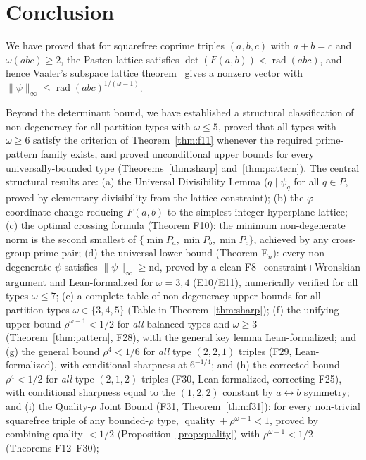 \documentclass[12pt]{article}
\theoremstyle{definition}
\DeclareMathOperator{\rad}{rad}
\begin{document}
\endgroup
\section{Conclusion}

We have proved that for squarefree coprime triples $(a,b,c)$ with $a+b=c$ and
$\omega(abc) \ge 2$, the Pasten lattice satisfies $\det(F(a,b)) < \rad(abc)$,
and hence Vaaler's subspace lattice theorem~\cite{Vaaler1979} gives a nonzero vector with
$\|\psi\|_\infty \le \rad(abc)^{1/(\omega-1)}$.

Beyond the determinant bound, we have established a structural classification of
non-degeneracy for all partition types with $\omega \le 5$, proved that all
types with $\omega \ge 6$ satisfy the criterion of Theorem~\ref{thm:f11}
whenever the required prime-pattern family exists, and proved
unconditional upper bounds for every universally-bounded type
(Theorems~\ref{thm:sharp} and~\ref{thm:pattern}).  The central structural
results are: (a) the Universal Divisibility Lemma ($q \mid \psi_q$ for all $q \in P$,
proved by elementary divisibility from the lattice constraint); (b) the $\varphi$-coordinate
change reducing $F(a,b)$ to the simplest integer hyperplane lattice; (c) the optimal
crossing formula (Theorem F10): the minimum non-degenerate norm is the second smallest
of $\{\min P_a, \min P_b, \min P_c\}$, achieved by any cross-group prime pair;
(d) the universal lower bound (Theorem E$_n$): every non-degenerate $\psi$ satisfies
$\|\psi\|_\infty \ge \mathrm{nd}$, proved by a clean F8+constraint+Wronskian argument
and Lean-formalized for $\omega=3,4$ (E10/E11), numerically verified for all types $\omega\le 7$;
(e) a complete table of non-degeneracy upper bounds for all partition types
$\omega \in \{3,4,5\}$ (Table in Theorem~\ref{thm:sharp}); (f) the unifying
upper bound $\rho^{\omega-1}<1/2$ for \emph{all} balanced types and $\omega \ge 3$
(Theorem~\ref{thm:pattern}, F28), with the general key lemma Lean-formalized; and
(g) the general bound $\rho^4 < 1/6$ for \emph{all} type $(2,2,1)$ triples (F29,
Lean-formalized), with conditional sharpness at $6^{-1/4}$;
and (h) the corrected bound $\rho^4 < 1/2$ for \emph{all} type $(2,1,2)$ triples (F30,
Lean-formalized, correcting F25), with conditional sharpness equal to the $(1,2,2)$ constant by
$a \leftrightarrow b$ symmetry; and (i) the Quality-$\rho$ Joint Bound (F31,
Theorem~\ref{thm:f31}): for every non-trivial squarefree triple of any bounded-$\rho$
type, $\operatorname{quality} + \rho^{\omega-1} < 1$, proved by combining quality $< 1/2$
(Proposition~\ref{prop:quality}) with $\rho^{\omega-1} < 1/2$ (Theorems F12--F30);
\end{document}
